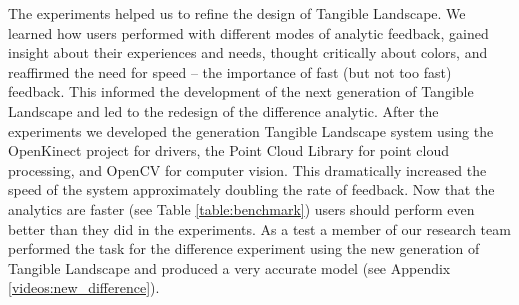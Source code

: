 \documentclass[prodmode,acmtochi]{acmsmall} %
\begin{document}
The experiments helped us to refine the design of Tangible Landscape. 
We learned how users performed with different modes of analytic feedback, 
gained insight about their experiences and needs,
thought critically about colors, 
and reaffirmed the need for speed -- 
the importance of fast (but not too fast) feedback. 
This informed the development of the next generation of Tangible Landscape 
and led to the redesign of the difference analytic. 
After the experiments
we developed the  generation Tangible Landscape system
using 
the OpenKinect project for drivers,
the Point Cloud Library for point cloud processing, 
and OpenCV for computer vision. 
This dramatically increased the speed of the system
approximately doubling the rate of feedback.
Now that the analytics are faster (see Table \ref{table:benchmark})
users should perform even better than they did in the experiments.
As a test a member of our research team 
performed the task for the difference experiment 
using the new generation of Tangible Landscape
and produced a very accurate model  
(see Appendix \ref{videos:new_difference}).





% 
%

\end{document}
